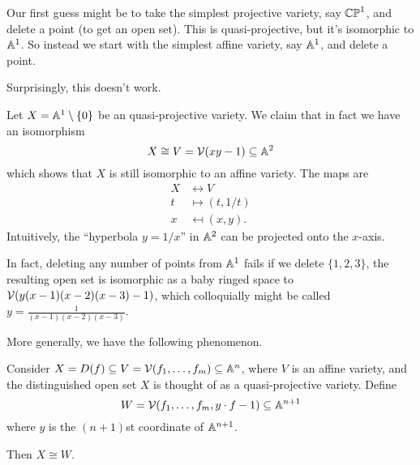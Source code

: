 Our first guess might be to take the simplest projective variety,
say $\mathbb{CP}^1$, and delete a point (to get an open set).
This is quasi-projective, but it's isomorphic to $\mathbb A^1$.
So instead we start with the simplest affine variety,
say $\mathbb A^1$, and delete a point.

Surprisingly, this doesn't work.
\begin{example}
	Let $X = \mathbb A^1 \setminus \{0\}$ be an quasi-projective variety.
	We claim that in fact we have an isomorphism
	\[ X \cong V = \mathcal V(xy-1) \subseteq \mathbb A^2 \]
	which shows that $X$ is still isomorphic to an affine variety.
	The maps are
	\begin{align*}
		X & \leftrightarrow V \\
		t &\mapsto (t, 1/t) \\
		x &\mapsfrom (x, y).
	\end{align*}
	Intuitively, the ``hyperbola $y=1/x$'' in $\mathbb A^2$ can be projected
	onto the $x$-axis.
\end{example}
In fact, deleting any number of points from $\mathbb A^1$ fails
if we delete $\{1,2,3\}$, the resulting open set
is isomorphic as a baby ringed space to $\mathcal V(y(x-1)(x-2)(x-3)-1)$,
which colloquially might be called $y = \frac{1}{(x-1)(x-2)(x-3)}$.

More generally, we have the following phenomenon.
\begin{theorem}
	Consider $X = D(f) \subseteq V = \mathcal V(f_1, \dots, f_m) \subseteq \mathbb A^n$,
	where $V$ is an affine variety,
	and the distinguished open set $X$ is thought of as
	a quasi-projective variety.
	Define
	\[ W = \mathcal V(f_1, \dots, f_m, y \cdot f-1) \subseteq \mathbb A^{n+1} \]
	where $y$ is the $(n+1)$st coordinate of $\mathbb A^{n+1}$.

	Then $X \cong W$.
\end{theorem}

